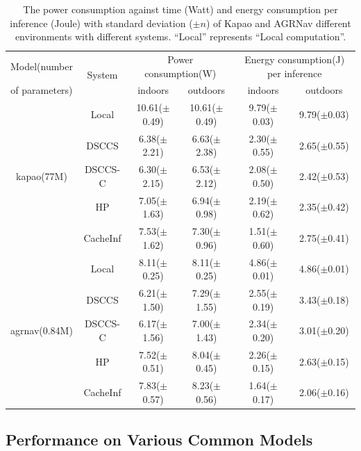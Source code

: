 \begin{table}[htb]
\centering
\begin{tabular}{cc|c|c|c|c}
\toprule
 Model(number & \multirow[c]{2}{*}{System} & \multicolumn{2}{|c|}{Power consumption(W)} & \multicolumn{2}{|c}{Energy consumption(J) per inference} \\
 of parameters)&  & indoors & outdoors & indoors & outdoors \\
\midrule
\midrule
\multirow[c]{5}{*}{kapao(77M)} & Local & 10.61($\pm$0.49) & 10.61($\pm$0.49) & 9.79($\pm$0.03) & 9.79($\pm$0.03) \\
 & DSCCS & 6.38($\pm$2.21) & 6.63($\pm$2.38) & 2.30($\pm$0.55) & 2.65($\pm$0.55) \\
 & DSCCS-C & 6.30($\pm$2.15) & 6.53($\pm$2.12) & 2.08($\pm$0.50) & 2.42($\pm$0.53) \\
 & HP & 7.05($\pm$1.63) & 6.94($\pm$0.98) & 2.19($\pm$0.62) & 2.35($\pm$0.42) \\
 & CacheInf & 7.53($\pm$1.62) & 7.30($\pm$0.96) & 1.51($\pm$0.60) & 2.75($\pm$0.41) \\
\cline{1-6}
\multirow[c]{5}{*}{agrnav(0.84M)} & Local & 8.11($\pm$0.25) & 8.11($\pm$0.25) & 4.86($\pm$0.01) & 4.86($\pm$0.01) \\
 & DSCCS & 6.21($\pm$1.50) & 7.29($\pm$1.55) & 2.55($\pm$0.19) & 3.43($\pm$0.18) \\
 & DSCCS-C & 6.17($\pm$1.56) & 7.00($\pm$1.43) & 2.34($\pm$0.20) & 3.01($\pm$0.20) \\
 & HP & 7.52($\pm$0.51) & 8.04($\pm$0.45) & 2.26($\pm$0.15) & 2.63($\pm$0.15) \\
 & CacheInf & 7.83($\pm$0.57) & 8.23($\pm$0.56) & 1.64($\pm$0.17) & 2.06($\pm$0.16) \\
\cline{1-6}
\bottomrule
\end{tabular}

    \caption{The power consumption against time (Watt) and energy consumption per inference (Joule) with standard deviation ($\pm n$) of Kapao and AGRNav different environments with different systems. ``Local'' represents ``Local computation''.}
    \label{tab:e2e_power}
\end{table}

\subsection{Performance on Various Common Models}

